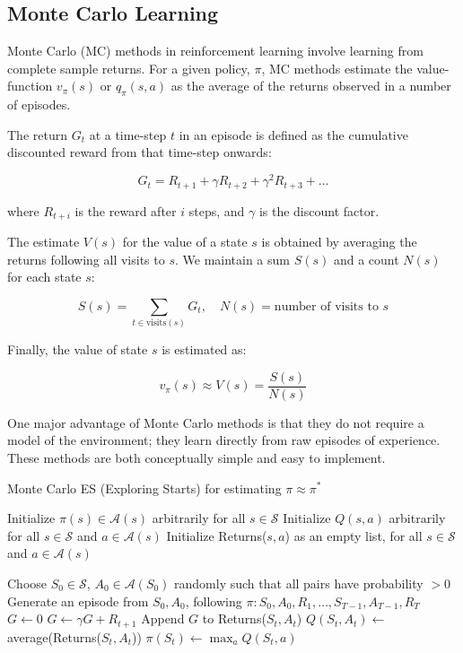 \subsection{Monte Carlo Learning}
Monte Carlo (MC) methods in reinforcement learning involve learning from complete sample returns. For a given policy, $\pi$, MC methods estimate the value-function $v_{\pi}(s)$ or $q_{\pi}(s,a)$  as the average of the returns observed in a number of episodes. 

The return $G_t$ at a time-step $t$ in an episode is defined as the cumulative discounted reward from that time-step onwards:

\[
G_t = R_{t+1} + \gamma R_{t+2} + \gamma^2 R_{t+3} + \ldots
\]

where $R_{t+i}$ is the reward after $i$ steps, and $\gamma$ is the discount factor. 

The estimate $V(s)$ for the value of a state $s$ is obtained by averaging the returns following all visits to $s$. We maintain a sum $S(s)$ and a count $N(s)$ for each state $s$:

\[
S(s) = \sum_{t \in \text{visits}(s)} G_t, \quad N(s) = \text{number of visits to } s
\]

Finally, the value of state $s$ is estimated as:

\[
v_{\pi}(s) \approx V(s) = \frac{S(s)}{N(s)}
\]

One major advantage of Monte Carlo methods is that they do not require a model of the environment; they learn directly from raw episodes of experience. These methods are both conceptually simple and easy to implement.


\begin{algorithm}
\caption{Monte Carlo ES (Exploring Starts) for estimating $\pi \approx \pi^*$}\label{MCES}
\begin{algorithmic}[1]
\State Initialize $\pi(s) \in \mathcal{A}(s)$ arbitrarily for all $s \in \mathcal{S}$
\State Initialize $Q(s, a)$ arbitrarily for all $s \in \mathcal{S}$ and $a \in \mathcal{A}(s)$
\State Initialize Returns($s, a$) as an empty list, for all $s \in \mathcal{S}$ and $a \in \mathcal{A}(s)$

 
    \State Choose $S_0 \in \mathcal{S}$, $A_0 \in \mathcal{A}(S_0)$ randomly such that all pairs have probability $> 0$
    \State Generate an episode from $S_0, A_0$, following $\pi: S_0, A_0, R_1, \ldots, S_{T-1}, A_{T-1}, R_T$
    \State $G \gets 0$
        \State $G \gets \gamma G + R_{t+1}$
            \State Append $G$ to Returns($S_t, A_t$)
            \State $Q(S_t, A_t) \gets$ average(Returns($S_t, A_t$))
            \State $\pi(S_t)\gets \max_a Q(S_t, a)$
        \EndIf
    \EndFor
\EndWhile
\EndProcedure
\end{algorithmic}
\end{algorithm}




